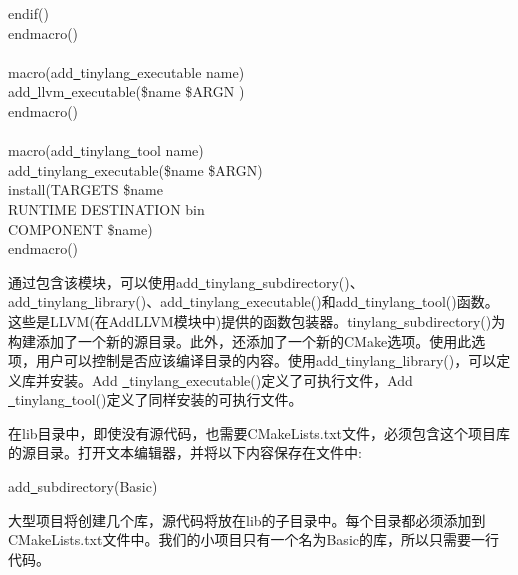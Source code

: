 \begin{tcolorbox}[colback=white,colframe=black]
\hspace*{0.5cm}endif() \\
endmacro() \\
 \\
macro(add\underline{~}tinylang\underline{~}executable name) \\
\hspace*{0.5cm}add\underline{~}llvm\underline{~}executable(\${name} \${ARGN} ) \\
endmacro() \\
 \\
macro(add\underline{~}tinylang\underline{~}tool name) \\
\hspace*{0.5cm}add\underline{~}tinylang\underline{~}executable(\${name} \${ARGN}) \\
\hspace*{0.5cm}install(TARGETS \${name} \\
\hspace*{1cm}RUNTIME DESTINATION bin \\
\hspace*{1cm}COMPONENT \${name}) \\
endmacro()
\end{tcolorbox}

通过包含该模块，可以使用add\underline{~}tinylang\underline{~}subdirectory()、add\underline{~}tinylang\underline{~}library()、add\underline{~}tinylang\underline{~}exe\allowbreak cutable()和add\underline{~}tinylang\underline{~}tool()函数。这些是LLVM(在AddLLVM模块中)提供的函数包装器。tinylang\underline{~}subdirectory()为构建添加了一个新的源目录。此外，还添加了一个新的CMake选项。使用此选项，用户可以控制是否应该编译目录的内容。使用add\underline{~}tinylang\underline{~}library()，可以定义库并安装。Add \underline{~}tinylang\underline{~}executable()定义了可执行文件，Add \underline{~}tinylang\underline{~}tool()定义了同样安装的可执行文件。\par

在lib目录中，即使没有源代码，也需要CMakeLists.txt文件，必须包含这个项目库的源目录。打开文本编辑器，并将以下内容保存在文件中:\par

\begin{tcolorbox}[colback=white,colframe=black]
add\underline{~}subdirectory(Basic)
\end{tcolorbox}

大型项目将创建几个库，源代码将放在lib的子目录中。每个目录都必须添加到CMakeLists.txt文件中。我们的小项目只有一个名为Basic的库，所以只需要一行代码。\par


